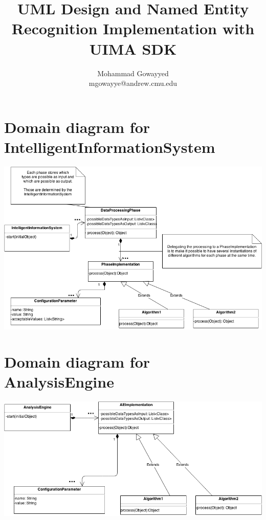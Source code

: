 \documentclass{article}
\begin{document}
\title{\textbf{UML Design} and Named Entity Recognition Implementation with UIMA SDK}
\author{Mohammad Gowayyed \\ mgowayye@andrew.cmu.edu}

\maketitle

\section{Domain diagram for IntelligentInformationSystem}

\includegraphics[width=14cm]{uml1.png}


\section{Domain diagram for AnalysisEngine}

\includegraphics[width=14cm]{uml2.png}
\end{document}

